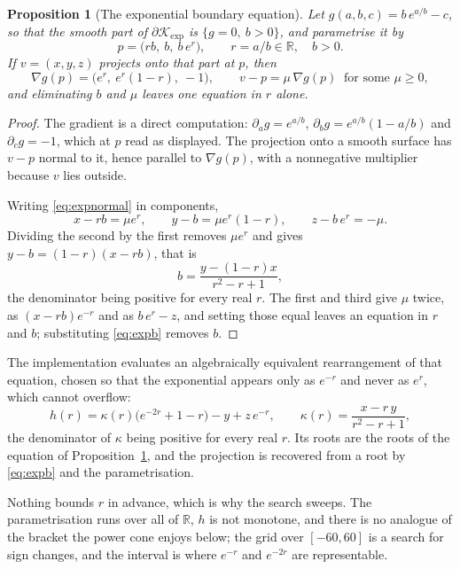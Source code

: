 \documentclass[a4paper,11pt]{book}
\theoremstyle{plain}
\newtheorem{proposition}[theorem]{Proposition}
\theoremstyle{definition}
\theoremstyle{remark}
\numberwithin{equation}{chapter}
\numberwithin{algorithm}{chapter}
\newcommand{\R}{\mathbb{R}}
\newcommand{\Kexp}{\mathcal{K}_{\exp}}
\begin{document}
	\begin{proposition}[The exponential boundary equation]\label{prop:expbound}
		Let $g(a,b,c)=b\,e^{a/b}-c$, so that the smooth part of $\partial\Kexp$ is
		$\{g=0,\ b>0\}$, and parametrise it by
		\begin{equation}
			p=\bigl(rb,\ b,\ b\,e^{r}\bigr),
			\qquad r=a/b\in\R,\quad b>0 .
		\end{equation}
		If $v=(x,y,z)$ projects onto that part at $p$, then
		\begin{equation}\label{eq:expnormal}
			\nabla g(p)=\bigl(e^{r},\ e^{r}(1-r),\ -1\bigr),
			\qquad
			v-p=\mu\,\nabla g(p)\ \text{ for some }\mu\geq0 ,
		\end{equation}
		and eliminating $b$ and $\mu$ leaves one equation in $r$ alone.
	\end{proposition}

	\begin{proof}
		The gradient is a direct computation:
		$\partial_ag=e^{a/b}$, $\partial_bg=e^{a/b}(1-a/b)$ and
		$\partial_cg=-1$, which at $p$ read as displayed. The projection onto a
		smooth surface has $v-p$ normal to it, hence parallel to $\nabla g(p)$,
		with a nonnegative multiplier because $v$ lies outside.

		Writing \eqref{eq:expnormal} in components,
		\[
		x-rb=\mu e^{r},
		\qquad
		y-b=\mu e^{r}(1-r),
		\qquad
		z-b\,e^{r}=-\mu .
		\]
		Dividing the second by the first removes $\mu e^{r}$ and gives
		$y-b=(1-r)(x-rb)$, that is
		\begin{equation}\label{eq:expb}
			b=\frac{y-(1-r)x}{r^{2}-r+1} ,
		\end{equation}
		the denominator being positive for every real $r$. The first and third give
		$\mu$ twice, as $(x-rb)e^{-r}$ and as $b\,e^{r}-z$, and setting those equal
		leaves an equation in $r$ and $b$; substituting \eqref{eq:expb} removes $b$.
	\end{proof}

	The implementation evaluates an algebraically equivalent rearrangement of that
	equation, chosen so that the exponential appears only as $e^{-r}$ and never as
	$e^{r}$, which cannot overflow:
	\[
	h(r)=\kappa(r)\bigl(e^{-2r}+1-r\bigr)-y+z\,e^{-r},
	\qquad
	\kappa(r)=\frac{x-r\,y}{r^2-r+1} ,
	\]
	the denominator of $\kappa$ being positive for every real $r$. Its roots are
	the roots of the equation of Proposition~\ref{prop:expbound}, and the
	projection is recovered from a root by \eqref{eq:expb} and the
	parametrisation.

	Nothing bounds $r$ in advance, which is why the search sweeps. The
	parametrisation runs over all of $\R$, $h$ is not monotone, and there is no
	analogue of the bracket the power cone enjoys below; the grid over
	$[-60,60]$ is a search for sign changes, and the interval is where $e^{-r}$
	and $e^{-2r}$ are representable.
\end{document}

